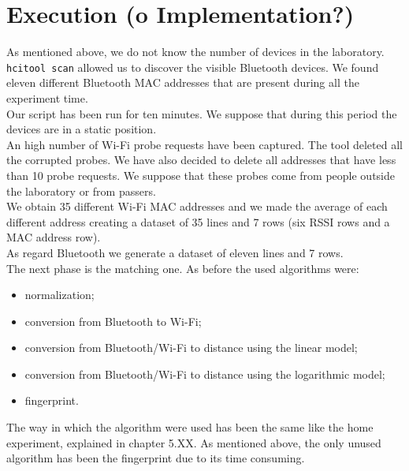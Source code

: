 \section{Execution (o Implementation?)}
As mentioned above, we do not know the number of devices in the laboratory.\\
\texttt{hcitool scan} allowed us to discover the visible Bluetooth devices. We found eleven different Bluetooth MAC addresses that are present during all the experiment time.\\
Our script has been run for ten minutes. We suppose that during this period the devices are in a static position.\\
\linebreak
An high number of Wi-Fi probe requests have been captured. The tool deleted all the corrupted probes. We have also decided to delete all addresses that have less than 10 probe requests. We suppose that these probes come from people outside the laboratory or from passers.\\
We obtain 35 different Wi-Fi MAC addresses and we made the average of each different address creating a dataset of 35 lines and 7 rows (six RSSI rows and a MAC address row).\\
As regard Bluetooth we generate a dataset of eleven lines and 7 rows.\\
\linebreak
The next phase is the matching one. As before the used algorithms were:
\begin{itemize}
\item normalization;
\item conversion from Bluetooth to Wi-Fi;
\item conversion from Bluetooth/Wi-Fi to distance using the linear model;
\item conversion from Bluetooth/Wi-Fi to distance using the logarithmic model;
\item fingerprint.
\end{itemize}
The way in which the algorithm were used has been the same like the home experiment, explained in chapter 5.XX. As mentioned above, the only unused algorithm has been the fingerprint due to its time consuming.\\

